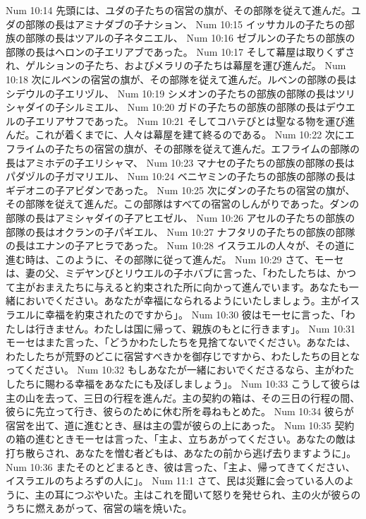 Num 10:14  先頭には、ユダの子たちの宿営の旗が、その部隊を従えて進んだ。ユダの部隊の長はアミナダブの子ナション、
Num 10:15  イッサカルの子たちの部族の部隊の長はツアルの子ネタニエル、
Num 10:16  ゼブルンの子たちの部族の部隊の長はヘロンの子エリアブであった。
Num 10:17  そして幕屋は取りくずされ、ゲルションの子たち、およびメラリの子たちは幕屋を運び進んだ。
Num 10:18  次にルベンの宿営の旗が、その部隊を従えて進んだ。ルベンの部隊の長はシデウルの子エリヅル、
Num 10:19  シメオンの子たちの部族の部隊の長はツリシャダイの子シルミエル、
Num 10:20  ガドの子たちの部族の部隊の長はデウエルの子エリアサフであった。
Num 10:21  そしてコハテびとは聖なる物を運び進んだ。これが着くまでに、人々は幕屋を建て終るのである。
Num 10:22  次にエフライムの子たちの宿営の旗が、その部隊を従えて進んだ。エフライムの部隊の長はアミホデの子エリシャマ、
Num 10:23  マナセの子たちの部族の部隊の長はパダヅルの子ガマリエル、
Num 10:24  ベニヤミンの子たちの部族の部隊の長はギデオニの子アビダンであった。
Num 10:25  次にダンの子たちの宿営の旗が、その部隊を従えて進んだ。この部隊はすべての宿営のしんがりであった。ダンの部隊の長はアミシャダイの子アヒエゼル、
Num 10:26  アセルの子たちの部族の部隊の長はオクランの子パギエル、
Num 10:27  ナフタリの子たちの部族の部隊の長はエナンの子アヒラであった。
Num 10:28  イスラエルの人々が、その道に進む時は、このように、その部隊に従って進んだ。
Num 10:29  さて、モーセは、妻の父、ミデヤンびとリウエルの子ホバブに言った、「わたしたちは、かつて主がおまえたちに与えると約束された所に向かって進んでいます。あなたも一緒においでください。あなたが幸福になられるようにいたしましょう。主がイスラエルに幸福を約束されたのですから」。
Num 10:30  彼はモーセに言った、「わたしは行きません。わたしは国に帰って、親族のもとに行きます」。
Num 10:31  モーセはまた言った、「どうかわたしたちを見捨てないでください。あなたは、わたしたちが荒野のどこに宿営すべきかを御存じですから、わたしたちの目となってください。
Num 10:32  もしあなたが一緒においでくださるなら、主がわたしたちに賜わる幸福をあなたにも及ぼしましょう」。
Num 10:33  こうして彼らは主の山を去って、三日の行程を進んだ。主の契約の箱は、その三日の行程の間、彼らに先立って行き、彼らのために休む所を尋ねもとめた。
Num 10:34  彼らが宿営を出て、道に進むとき、昼は主の雲が彼らの上にあった。
Num 10:35  契約の箱の進むときモーセは言った、「主よ、立ちあがってください。あなたの敵は打ち散らされ、あなたを憎む者どもは、あなたの前から逃げ去りますように」。
Num 10:36  またそのとどまるとき、彼は言った、「主よ、帰ってきてください、イスラエルのちよろずの人に」。
Num 11:1  さて、民は災難に会っている人のように、主の耳につぶやいた。主はこれを聞いて怒りを発せられ、主の火が彼らのうちに燃えあがって、宿営の端を焼いた。

